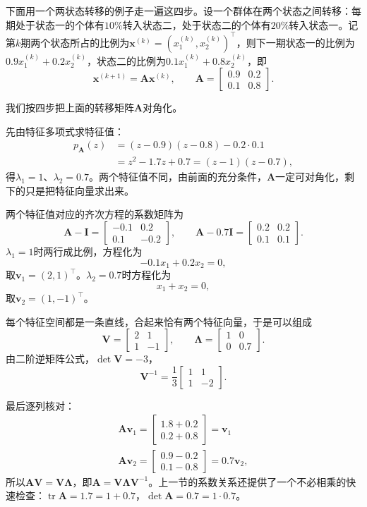下面用一个两状态转移的例子走一遍这四步。设一个群体在两个状态之间转移：每期处于状态一的个体有$10\%$转入状态二，处于状态二的个体有$20\%$转入状态一。记第$k$期两个状态所占的比例为$\bm x^{(k)}=(x_1^{(k)},x_2^{(k)})^{\top}$，则下一期状态一的比例为$0.9x_1^{(k)}+0.2x_2^{(k)}$，状态二的比例为$0.1x_1^{(k)}+0.8x_2^{(k)}$，即
\[
 \bm x^{(k+1)}=\bm A\bm x^{(k)},\qquad
 \bm A=\begin{bmatrix}0.9&0.2\\0.1&0.8\end{bmatrix}.
\]
\begin{example}[两状态转移矩阵的对角化]
\label{ex:ls-transition-matrix-diagonalization}
我们按四步把上面的转移矩阵$\bm A$对角化。

先由特征多项式求特征值：
\[
 \begin{aligned}
 p_{\bm A}(z)&=(z-0.9)(z-0.8)-0.2\cdot0.1\\
 &=z^2-1.7z+0.7=(z-1)(z-0.7),
 \end{aligned}
\]
得$\lambda_1=1$、$\lambda_2=0.7$。两个特征值不同，由前面的充分条件，$\bm A$一定可对角化，剩下的只是把特征向量求出来。

两个特征值对应的齐次方程的系数矩阵为
\[
 \bm A-\bm I=\begin{bmatrix}-0.1&0.2\\0.1&-0.2\end{bmatrix},\qquad
 \bm A-0.7\bm I=\begin{bmatrix}0.2&0.2\\0.1&0.1\end{bmatrix}.
\]
$\lambda_1=1$时两行成比例，方程化为
\[
 -0.1x_1+0.2x_2=0,
\]
取$\bm v_1=(2,1)^{\top}$。$\lambda_2=0.7$时方程化为
\[
 x_1+x_2=0,
\]
取$\bm v_2=(1,-1)^{\top}$。

每个特征空间都是一条直线，合起来恰有两个特征向量，于是可以组成
\[
 \bm V=\begin{bmatrix}2&1\\1&-1\end{bmatrix},\qquad
 \bm\Lambda=\begin{bmatrix}1&0\\0&0.7\end{bmatrix}.
\]
由二阶逆矩阵公式，$\det\bm V=-3$，
\[
 \bm V^{-1}=\frac13\begin{bmatrix}1&1\\1&-2\end{bmatrix}.
\]

最后逐列核对：
\[
\begin{gathered}
\bm A\bm v_1=\begin{bmatrix}1.8+0.2\\0.2+0.8\end{bmatrix}=\bm v_1\\
\bm A\bm v_2=\begin{bmatrix}0.9-0.2\\0.1-0.8\end{bmatrix}=0.7\bm v_2,
\end{gathered}
\]
所以$\bm A\bm V=\bm V\bm\Lambda$，即$\bm A=\bm V\bm\Lambda\bm V^{-1}$。上一节的系数关系还提供了一个不必相乘的快速检查：$\operatorname{tr}\bm A=1.7=1+0.7$，$\det\bm A=0.7=1\cdot0.7$。
\end{example}


